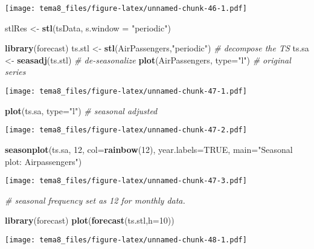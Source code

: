 \documentclass[]{article}
\newenvironment{Shaded}{\begin{snugshade}}{\end{snugshade}}
\newcommand{\KeywordTok}[1]{\textcolor[rgb]{0.13,0.29,0.53}{\textbf{{#1}}}}
\newcommand{\DataTypeTok}[1]{\textcolor[rgb]{0.13,0.29,0.53}{{#1}}}
\newcommand{\DecValTok}[1]{\textcolor[rgb]{0.00,0.00,0.81}{{#1}}}
\newcommand{\StringTok}[1]{\textcolor[rgb]{0.31,0.60,0.02}{{#1}}}
\newcommand{\CommentTok}[1]{\textcolor[rgb]{0.56,0.35,0.01}{\textit{{#1}}}}
\newcommand{\OtherTok}[1]{\textcolor[rgb]{0.56,0.35,0.01}{{#1}}}
\newcommand{\NormalTok}[1]{{#1}}
\numberwithin{equation}{section}
\begin{document}
\texttt{[image: tema8\_files/figure-latex/unnamed-chunk-46-1.pdf]}

\begin{Shaded}
\begin{Highlighting}[]
\NormalTok{stlRes <-}\StringTok{ }\KeywordTok{stl}\NormalTok{(tsData, }\DataTypeTok{s.window =} \StringTok{"periodic"}\NormalTok{)}
\end{Highlighting}
\end{Shaded}

\begin{Shaded}
\begin{Highlighting}[]
\KeywordTok{library}\NormalTok{(forecast)}
\NormalTok{ts.stl <-}\StringTok{ }\KeywordTok{stl}\NormalTok{(AirPassengers,}\StringTok{"periodic"}\NormalTok{)  }\CommentTok{# decompose the TS}
\NormalTok{ts.sa <-}\StringTok{ }\KeywordTok{seasadj}\NormalTok{(ts.stl)  }\CommentTok{# de-seasonalize}
\KeywordTok{plot}\NormalTok{(AirPassengers, }\DataTypeTok{type=}\StringTok{"l"}\NormalTok{)  }\CommentTok{# original series}
\end{Highlighting}
\end{Shaded}

\texttt{[image: tema8\_files/figure-latex/unnamed-chunk-47-1.pdf]}

\begin{Shaded}
\begin{Highlighting}[]
\KeywordTok{plot}\NormalTok{(ts.sa, }\DataTypeTok{type=}\StringTok{"l"}\NormalTok{)  }\CommentTok{# seasonal adjusted}
\end{Highlighting}
\end{Shaded}

\texttt{[image: tema8\_files/figure-latex/unnamed-chunk-47-2.pdf]}

\begin{Shaded}
\begin{Highlighting}[]
\KeywordTok{seasonplot}\NormalTok{(ts.sa, }\DecValTok{12}\NormalTok{, }\DataTypeTok{col=}\KeywordTok{rainbow}\NormalTok{(}\DecValTok{12}\NormalTok{), }\DataTypeTok{year.labels=}\OtherTok{TRUE}\NormalTok{,}
          \DataTypeTok{main=}\StringTok{"Seasonal plot: Airpassengers"}\NormalTok{)}
\end{Highlighting}
\end{Shaded}

\texttt{[image: tema8\_files/figure-latex/unnamed-chunk-47-3.pdf]}

\begin{Shaded}
\begin{Highlighting}[]
              \CommentTok{# seasonal frequency set as 12 for monthly data.}
\end{Highlighting}
\end{Shaded}

\begin{Shaded}
\begin{Highlighting}[]
\KeywordTok{library}\NormalTok{(forecast)}
\KeywordTok{plot}\NormalTok{(}\KeywordTok{forecast}\NormalTok{(ts.stl,}\DataTypeTok{h=}\DecValTok{10}\NormalTok{))}
\end{Highlighting}
\end{Shaded}

\texttt{[image: tema8\_files/figure-latex/unnamed-chunk-48-1.pdf]}
\end{document}
